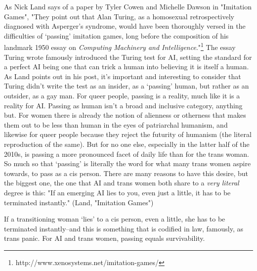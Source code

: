 \documentclass[12pt, a5paper, twoside, openright]{memoir}
\begin{document}
As Nick Land says of a paper by Tyler Cowen and Michelle Dawson in "Imitation Games", "They point out that Alan Turing, as a homosexual retrospectively diagnosed with Asperger's syndrome, would have been thoroughly versed in the difficulties of ‘passing' imitation games, long before the composition of his landmark 1950 essay on \textit{Computing Machinery and Intelligence}."\footnote{http://www.xenosystems.net/imitation-games/} The essay Turing wrote famously introduced the Turing test for AI, setting the standard for a perfect AI being one that can trick a human into believing it is itself a human. As Land points out in his post, it's important and interesting to consider that Turing didn't write the test as an insider, as a ‘passing' human, but rather as an outsider, as a gay man. For queer people, passing is a reality, much like it is a reality for AI. Passing as human isn't a broad and inclusive category, anything but. For women there is already the notion of alienness or otherness that makes them out to be less than human in the eyes of patriarchal humanism, and likewise for queer people because they reject the futurity of humanism (the literal reproduction of the same). But for no one else, especially in the latter half of the 2010s, is passing a more pronounced facet of daily life than for the trans woman. So much so that ‘passing' is literally the word for what many trans women aspire towards, to pass as a cis person. There are many reasons to have this desire, but the biggest one, the one that AI and trans women both share to a \textit{very literal} degree is this: "If an emerging AI lies to you, even just a little, it has to be terminated instantly." (Land, "Imitation Games")

If a transitioning woman ‘lies' to a cis person, even a little, she has to be terminated instantly--and this is something that is codified in law, famously, as trans panic. For AI and trans women, passing equals survivability.
\end{document}
